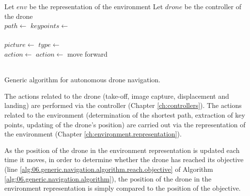 \begin{algorithm}[H]
    \begin{algorithmic}[1]
            \State Let $env$ be the representation of the environment
            \State Let $drone$ be the controller of the drone \\
            \State $path \gets$  
            \State $keypoints \gets$   \\
            \State {}  \\
            \label{alg:06.generic.navigation.algorithm.reach.objective}
                \State $picture \gets$  
                \State $type \gets$   \\
                    \State $action \gets$  \label{alg:06.generic.navigation.algorithm.get.action}
                \Else
                    \State {} 
                    \State $action \gets$ move forward
                \EndIf \\
                \State {} 
                \State {} 
            \EndWhile \\
            \State {} 
        \EndFunction
    \end{algorithmic}
    \caption{Generic algorithm for autonomous drone navigation.}
    \label{alg:06.generic.navigation.algorithm}
\end{algorithm}

The actions related to the drone (take-off, image capture, displacement and landing) are performed via the controller (Chapter \ref{ch:controllers}). The actions related to the environment (determination of the shortest path, extraction of key points, updating of the drone's position) are carried out via the representation of the environment (Chapter \ref{ch:environment.representation}).

As the position of the drone in the environment representation is updated each time it moves, in order to determine whether the drone has reached its objective (line \ref{alg:06.generic.navigation.algorithm.reach.objective} of Algorithm \ref{alg:06.generic.navigation.algorithm}), the position of the drone in the environment representation is simply compared to the position of the objective.

